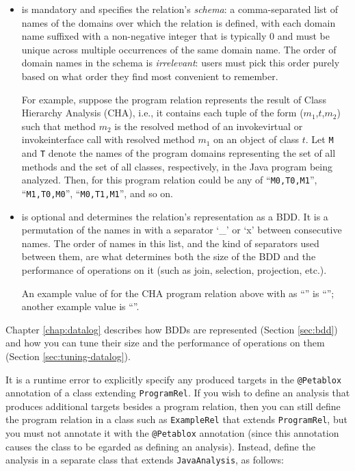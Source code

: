 \begin{itemize}

\item

 is mandatory and specifies the relation's {\it schema}: a comma-separated list of names of
the domains over which the relation is defined, with each domain name suffixed with a
non-negative integer that is typically 0 and must be unique across multiple
occurrences of the same domain name.
The order of domain names in the schema is {\it irrelevant}: users must
pick this order purely based on what order they find most convenient to remember.

For example, suppose the program relation represents the result of Class Hierarchy
Analysis (CHA), i.e., it contains each tuple of the form ($m_1$,$t$,$m_2$) such that
method $m_2$ is the resolved method of an invokevirtual or invokeinterface call
with resolved method $m_1$ on an object of class $t$.  Let {\tt M} and {\tt T}
denote the names of the program domains representing the set of all methods
and the set of all classes, respectively, in the Java program being analyzed.
Then,  for this program relation could be any of ``{\tt M0,T0,M1}'',
``{\tt M1,T0,M0}'', ``{\tt M0,T1,M1}'', and so on.

\item

 is optional and determines the relation's representation as a
BDD. It is a permutation of the names in  with a separator
`\_' or `x' between consecutive names.  The order of names in this
list, and the kind of separators used between them, are what determines both
the size of the BDD and the performance of operations on it (such as join,
selection, projection, etc.).

An example value of  for the
CHA program relation above with  as ``''  is
``''; another example value is ``''.
\end{itemize}

Chapter \ref{chap:datalog} describes how BDDs are represented
(Section \ref{sec:bdd}) and how you can tune their size and the
performance of operations on them (Section \ref{sec:tuning-datalog}).

It is a runtime error to explicitly specify any produced targets in the
{\tt @Petablox} annotation of a class extending {\tt ProgramRel}.  If you wish to
define an analysis that produces additional targets besides a program relation,
then you can still define the program relation in a class such as
{\tt ExampleRel} that extends {\tt ProgramRel}, but you must not annotate it
with the {\tt @Petablox} annotation (since this annotation causes the class to be 
egarded as defining an analysis).  Instead, define the analysis in a separate
class that extends {\tt JavaAnalysis}, as follows:

